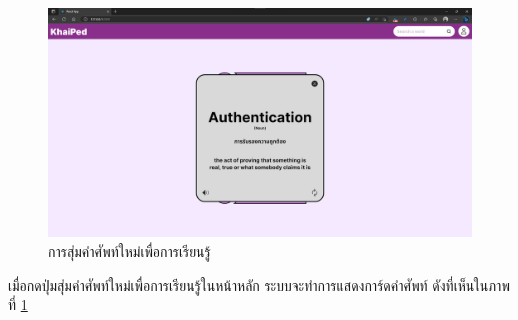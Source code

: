 \documentclass[12pt,oneside,openright,a4paper]{cpe-thai-project}
\begin{document}
\pagebreak
\begin{figure}[!h]\centering
	\includegraphics[width=\textwidth, keepaspectratio=true]{image/chap4/UI/random.png}
	\caption{{การสุ่มคำศัพท์ใหม่เพื่อการเรียนรู้}}\label{fig:chap4UIRandom}
\end{figure}
\hspace{1cm}
เมื่อกดปุ่มสุ่มคำศัพท์ใหม่เพื่อการเรียนรู้ในหน้าหลัก ระบบจะทำการแสดงการ์ดคำศัพท์ ดังที่เห็นในภาพที่ \ref{fig:chap4UIRandom} 



\makeatletter
\g@addto@macro{\UrlBreaks}{\UrlOrds}
\makeatother
% 



\end{document}
